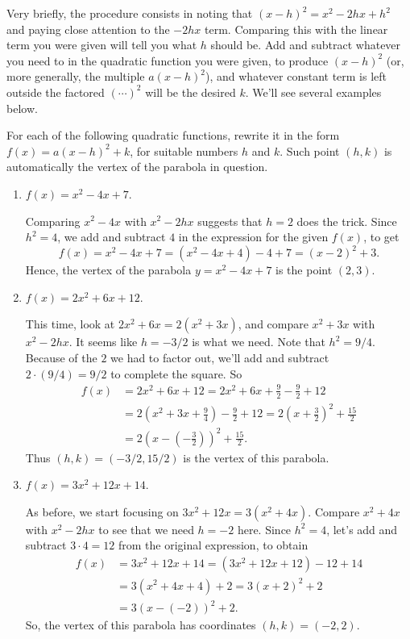\documentclass{ximera}
\begin{document}
Very briefly, the procedure consists in noting that $(x-h)^2 = x^2-2hx+h^2$ and paying close attention to the $-2hx$ term. Comparing this with the linear term you were given will tell you what $h$ should be. Add and subtract whatever you need to in the quadratic function you were given, to produce $(x-h)^2$ (or, more generally, the multiple $a(x-h)^2$), and whatever constant term is left outside the factored $(\cdots)^2$ will be the desired $k$. We'll see several examples below.

\begin{example}
  For each of the following quadratic functions, rewrite it in the form $f(x) = a(x-h)^2+k$, for suitable numbers $h$ and $k$. Such point $(h,k)$ is automatically the vertex of the parabola in question.
  \begin{enumerate}[label=\alph*.]
  \item $f(x) = x^2-4x+7$. \\[.5em]
    \begin{explanation}
      Comparing $x^2-4x$ with $x^2-2hx$ suggests that $h=2$ does the trick. Since $h^2=4$, we add and subtract $4$ in the expression for the given $f(x)$, to get $$  f(x) = x^2-4x+7 =(x^2-4x+4)-4+7 = (x-2)^2+3.   $$Hence, the vertex of the parabola $y=x^2-4x+7$ is the point $(2,3)$.
    \end{explanation}
  \item $f(x) = 2x^2 + 6x+12$. \\[.5em]
    \begin{explanation}
      This time, look at $2x^2+6x = 2(x^2+3x)$, and compare $x^2+3x$ with $x^2-2hx$. It seems like $h=-3/2$ is what we need. Note that $h^2 = 9/4$. Because of the $2$ we had to factor out, we'll add and subtract $2 \cdot (9/4) = 9/2$ to complete the square. So \begin{align*}f(x) &= 2x^2+6x+12 = 2x^2+6x + \frac{9}{2} - \frac{9}{2} + 12 \\ &= 2\left(x^2+3x+\frac{9}{4}\right) -\frac{9}{2} + 12 = 2\left(x+\frac{3}{2}\right)^2 + \frac{15}{2}\\ &=  2\left(x-\left(-\frac{3}{2}\right)\right)^2 + \frac{15}{2}.\end{align*}Thus $(h,k) = (-3/2, 15/2)$ is the vertex of this parabola.
    \end{explanation}
  \item $f(x) = 3x^2 + 12x + 14$. \\[.5em]
    \begin{explanation}
      As before, we start focusing on $3x^2+12x = 3(x^2+4x)$. Compare $x^2+4x$ with $x^2-2hx$ to see that we need $h = -2$ here. Since $h^2 = 4$, let's add and subtract $3 \cdot 4 = 12$ from the original expression, to obtain
      \begin{align*}
        f(x) &= 3x^2+12x+14 = (3x^2+12x+12)-12+14 \\ &= 3(x^2+4x+4) + 2 = 3(x+2)^2+2 \\ &= 3(x-(-2))^2+2.
      \end{align*}
So, the vertex of this parabola has coordinates $(h,k) = (-2,2)$.
    \end{explanation}
  \end{enumerate}
\end{example}
\end{document}
